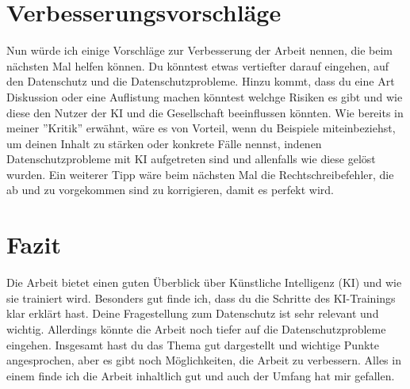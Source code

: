 \documentclass{article}
\begin{document}
\section{Verbesserungsvorschläge}

Nun würde ich einige Vorschläge zur Verbesserung der Arbeit nennen, die beim nächsten Mal helfen können. Du könntest etwas vertiefter darauf eingehen, auf den Datenschutz und die Datenschutzprobleme. Hinzu kommt, dass du eine Art Diskussion oder eine Auflistung machen könntest welchge Risiken es gibt und wie diese den Nutzer der KI und die Gesellschaft beeinflussen könnten. Wie bereits in meiner ''Kritik'' erwähnt, wäre es von Vorteil, wenn du Beispiele miteinbeziehst, um deinen Inhalt zu stärken oder konkrete Fälle  nennst, indenen Datenschutzprobleme mit KI aufgetreten sind und allenfalls wie diese gelöst wurden. Ein weiterer Tipp wäre beim nächsten Mal die Rechtschreibefehler, die ab und zu vorgekommen sind zu korrigieren, damit es perfekt wird.

\section{Fazit}
Die Arbeit bietet einen guten Überblick über Künstliche Intelligenz (KI) und wie sie trainiert wird. Besonders gut finde ich, dass du die Schritte des KI-Trainings klar erklärt hast. Deine Fragestellung zum Datenschutz ist sehr relevant und wichtig. Allerdings könnte die Arbeit noch tiefer auf die Datenschutzprobleme eingehen. Insgesamt hast du das Thema gut dargestellt und wichtige Punkte angesprochen, aber es gibt noch Möglichkeiten, die Arbeit zu verbessern. Alles in einem finde ich die Arbeit inhaltlich gut und auch der Umfang hat mir gefallen.




\printbibliography
\end{document}
